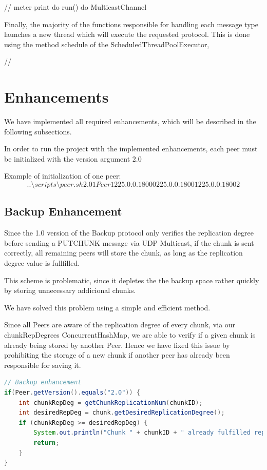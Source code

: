 \documentclass[11pt]{article}
\begin{document}
// meter print do run() do MulticastChannel

Finally, the majority of the functions responsible for handling each message type launches a new thread which will execute the requested protocol.
This is done using the method schedule of the ScheduledThreadPoolExecutor, 

//

\section{Enhancements}

We have implemented all required enhancements, which will be described in the following subsections.

In order to run the project with the implemented enhancements, each peer must be initialized with the version argument 2.0

Example of initialization of one peer:
\[..\setminus scripts\setminus peer.sh 2.0 1 Peer1 225.0.0.1 8000 225.0.0.1 8001 225.0.0.1 8002\]

\subsection{Backup Enhancement}
Since the 1.0 version of the Backup protocol only verifies the replication degree before sending a PUTCHUNK message via UDP Multicast, if the chunk is sent correctly,
all remaining peers will store the chunk, as long as the replication degree value is fullfilled.

This scheme is problematic, since it depletes the the backup space rather quickly by storing unnecessary addicional chunks.

We have solved this problem using a simple and efficient method.

Since all Peers are aware of the replication degree of every chunk, via our chunkRepDegrees ConcurrentHashMap, we are able to verify if a given chunk is already being stored
by another Peer. Hence we have fixed this issue by prohibiting the storage of a new chunk if another peer has already been responsible for saving it.

\begin{lstlisting}[language=java]
// Backup enhancement
if(Peer.getVersion().equals("2.0")) {
	int chunkRepDeg = getChunkReplicationNum(chunkID);
	int desiredRepDeg = chunk.getDesiredReplicationDegree();
	if (chunkRepDeg >= desiredRepDeg) {
		System.out.println("Chunk " + chunkID + " already fulfilled repDegree. Ignoring chunk...");
		return;
	}
}
\end{lstlisting}
\end{document}
